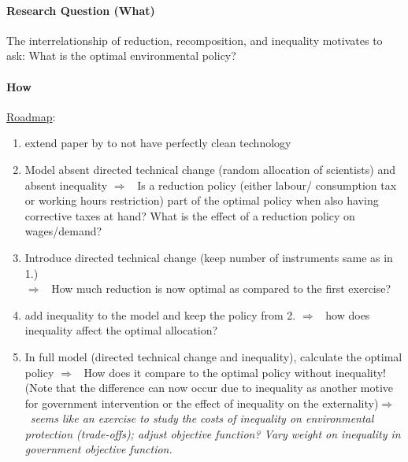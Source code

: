 \documentclass[12pt]{article}
\newcommand{\ar}{$\Rightarrow$ \ }
\begin{document}
\paragraph{Research Question (What)}

The interrelationship of reduction, recomposition, and inequality motivates to ask: What is the optimal environmental policy? 
 
\paragraph{How}
\underline{Roadmap}: 
\begin{enumerate}
	\item extend paper by \cite{Acemoglu2012TheChange} to not have perfectly clean technology
\item Model absent directed technical change (random allocation of scientists) and absent inequality \ar Is a reduction policy  (either labour/ consumption tax or working hours restriction) part of the optimal policy when also having corrective taxes at hand? What is the effect of a reduction policy on wages/demand? 
\item Introduce directed technical change (keep number of instruments same as in 1.) \\ \ar How much reduction is now optimal as compared to the first exercise?
\item add inequality to the model and keep the policy from 2. \ar how does inequality affect the optimal allocation?
\item In full model (directed technical change and inequality), calculate the optimal policy \ar How does it compare to the optimal policy without inequality! (Note that the difference can now occur due to inequality as another motive for government intervention or the effect of inequality on the externality)\ar \textit{seems like an exercise to study the costs of inequality on environmental protection (trade-offs); adjust objective function? Vary weight on inequality in government objective function. }


\end{enumerate}
\end{document}
